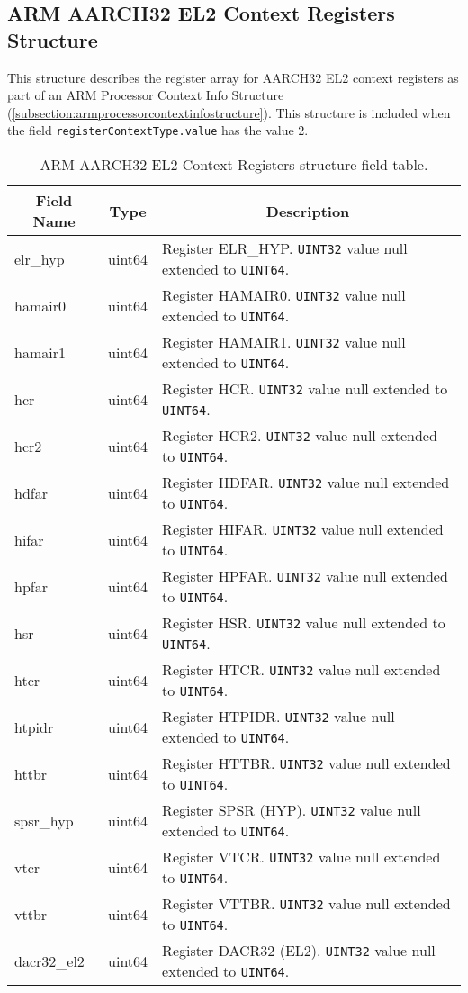 \documentclass{report}
\newcommand*{\thead}[1]{\multicolumn{1}{|c|}{\bfseries #1}}
\newcommand*{\jsontable}[1]{
    \begin{table}[!ht]
    \label{#1}
    \centering
    \begin{adjustbox}{center}
    \begin{tabular}{|l|c|p{8cm}|}
    \hline
    \thead{Field Name} & \thead{Type} & \thead{Description} \\
    \hline
}
\newcommand*{\jsontableend}[1]{
    \hline
    \end{tabular}
    \end{adjustbox}
    \caption{#1}
    \label{table:#1}
    \end{table}
    \FloatBarrier
}
\begin{document}
\subsection{ARM AARCH32 EL2 Context Registers Structure}
\label{subsection:armaarch32el2contextregistersstructure}
This structure describes the register array for AARCH32 EL2 context registers as part of an ARM Processor Context Info Structure (\ref{subsection:armprocessorcontextinfostructure}). This structure is included when the field \texttt{registerContextType.value} has the value 2.
\jsontable{table:armaarch32el2contextregistersstructure}
elr\_hyp & uint64 & Register ELR\_HYP. \texttt{UINT32} value null extended to \texttt{UINT64}.\\
\hline
hamair0 & uint64 & Register HAMAIR0. \texttt{UINT32} value null extended to \texttt{UINT64}.\\
\hline
hamair1 & uint64 & Register HAMAIR1. \texttt{UINT32} value null extended to \texttt{UINT64}.\\
\hline
hcr & uint64 & Register HCR. \texttt{UINT32} value null extended to \texttt{UINT64}.\\
\hline
hcr2 & uint64 & Register HCR2. \texttt{UINT32} value null extended to \texttt{UINT64}.\\
\hline
hdfar & uint64 & Register HDFAR. \texttt{UINT32} value null extended to \texttt{UINT64}.\\
\hline
hifar & uint64 & Register HIFAR. \texttt{UINT32} value null extended to \texttt{UINT64}.\\
\hline
hpfar & uint64 & Register HPFAR. \texttt{UINT32} value null extended to \texttt{UINT64}.\\
\hline
hsr & uint64 & Register HSR. \texttt{UINT32} value null extended to \texttt{UINT64}.\\
\hline
htcr & uint64 & Register HTCR. \texttt{UINT32} value null extended to \texttt{UINT64}.\\
\hline
htpidr & uint64 & Register HTPIDR. \texttt{UINT32} value null extended to \texttt{UINT64}.\\
\hline
httbr & uint64 & Register HTTBR. \texttt{UINT32} value null extended to \texttt{UINT64}.\\
\hline
spsr\_hyp & uint64 & Register SPSR (HYP). \texttt{UINT32} value null extended to \texttt{UINT64}.\\
\hline
vtcr & uint64 & Register VTCR. \texttt{UINT32} value null extended to \texttt{UINT64}.\\
\hline
vttbr & uint64 & Register VTTBR. \texttt{UINT32} value null extended to \texttt{UINT64}.\\
\hline
dacr32\_el2 & uint64 & Register DACR32 (EL2). \texttt{UINT32} value null extended to \texttt{UINT64}.\\
\hline
\jsontableend{ARM AARCH32 EL2 Context Registers structure field table.}
\end{document}
